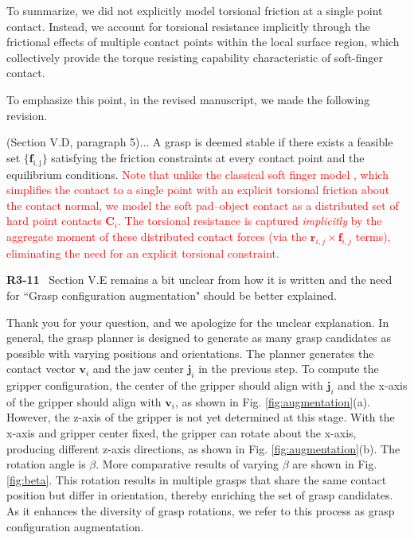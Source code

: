 \documentclass[journal]{IEEEtran}
\newcommand{\rev}[1]{\textcolor{red}{#1}}
\begin{document}
To summarize, we did not explicitly model torsional friction at a single point contact. Instead, we account for torsional resistance implicitly through the frictional effects of multiple contact points within the local surface region, which collectively provide the torque resisting capability characteristic of soft-finger contact.


To emphasize this point, in the revised manuscript, we made the following revision.

(Section V.D, paragraph 5)... A grasp is deemed stable if there exists a feasible set $\{\mathbf{f}_\mathrm{i,j}\}$ satisfying the friction constraints at every contact point and the equilibrium conditions.
\rev{Note that unlike the classical soft finger model \cite{murray1994mathematical}, which simplifies the contact to a single point with an explicit torsional friction about the contact normal, we model the soft pad--object contact as a distributed set of hard point contacts $\mathbf{C}_i$. The torsional resistance is captured \emph{implicitly} by the aggregate moment of these distributed contact forces (via the $\mathbf{r}_{i,j} \times \mathbf{f}_{i,j}$ terms), eliminating the need for an explicit torsional constraint.} 
\bigskip

\noindent
{\textbf{\color{black}R3-11}\color{gray}~
Section V.E remains a bit unclear from how it is written and the need for ``Grasp configuration augmentation" should be better explained.
}

Thank you for your question, and we apologize for the unclear explanation. In general, the grasp planner is designed to generate as many grasp candidates as possible with varying positions and orientations. The planner generates the contact vector $\mathbf{v}_{i}$ and the jaw center $\mathbf{j}_{i}$ in the previous step. To compute the gripper configuration, the center of the gripper should align with $\mathbf{j}_{i}$ and the x-axis of the gripper should align with $\mathbf{v}_{i}$, as shown in Fig. \ref{fig:augmentation}(a). However, the z-axis of the gripper is not yet determined at this stage. With the x-axis and gripper center fixed, the gripper can rotate about the x-axis, producing different z-axis directions, as shown in Fig. \ref{fig:augmentation}(b). The rotation angle is $\beta$. More comparative results of varying $\beta$ are shown in Fig. \ref{fig:beta}. This rotation results in multiple grasps that share the same contact position but differ in orientation, thereby enriching the set of grasp candidates. As it enhances the diversity of grasp rotations, we refer to this process as grasp configuration augmentation.
\end{document}
